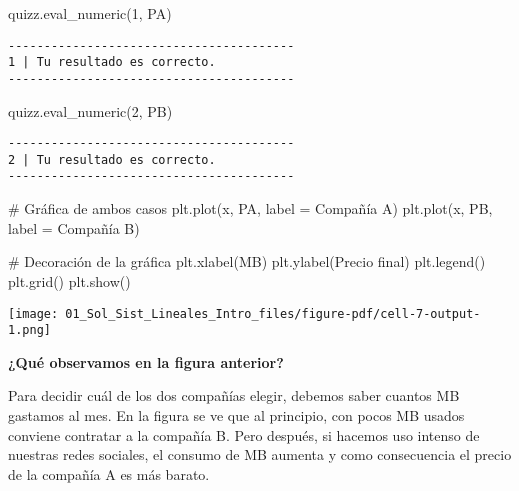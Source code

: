 \documentclass[
  letterpaper,
  DIV=11,
  numbers=noendperiod]{scrreprt}
\newenvironment{Shaded}{\begin{snugshade}}{\end{snugshade}}
\newcommand{\CommentTok}[1]{\textcolor[rgb]{0.37,0.37,0.37}{#1}}
\newcommand{\NormalTok}[1]{\textcolor[rgb]{0.00,0.23,0.31}{#1}}
\newcommand{\OperatorTok}[1]{\textcolor[rgb]{0.37,0.37,0.37}{#1}}
\newcommand{\StringTok}[1]{\textcolor[rgb]{0.13,0.47,0.30}{#1}}
\begin{document}
\begin{Shaded}
\begin{Highlighting}[]
\NormalTok{quizz.eval\_numeric(}\StringTok{\textquotesingle{}1\textquotesingle{}}\NormalTok{, PA)}
\end{Highlighting}
\end{Shaded}

\begin{verbatim}
----------------------------------------
1 | Tu resultado es correcto.
----------------------------------------
\end{verbatim}

\begin{Shaded}
\begin{Highlighting}[]
\NormalTok{quizz.eval\_numeric(}\StringTok{\textquotesingle{}2\textquotesingle{}}\NormalTok{, PB)}
\end{Highlighting}
\end{Shaded}

\begin{verbatim}
----------------------------------------
2 | Tu resultado es correcto.
----------------------------------------
\end{verbatim}

\begin{Shaded}
\begin{Highlighting}[]
\CommentTok{\# Gráfica de ambos casos}
\NormalTok{plt.plot(x, PA, label }\OperatorTok{=} \StringTok{\textquotesingle{}Compañía A\textquotesingle{}}\NormalTok{)}
\NormalTok{plt.plot(x, PB, label }\OperatorTok{=} \StringTok{\textquotesingle{}Compañía B\textquotesingle{}}\NormalTok{)}

\CommentTok{\# Decoración de la gráfica}
\NormalTok{plt.xlabel(}\StringTok{\textquotesingle{}MB\textquotesingle{}}\NormalTok{)}
\NormalTok{plt.ylabel(}\StringTok{\textquotesingle{}Precio final\textquotesingle{}}\NormalTok{)}
\NormalTok{plt.legend()}
\NormalTok{plt.grid()}
\NormalTok{plt.show()}
\end{Highlighting}
\end{Shaded}

\texttt{[image: 01\_Sol\_Sist\_Lineales\_Intro\_files/figure-pdf/cell-7-output-1.png]}

\textbf{¿Qué observamos en la figura anterior?}

Para decidir cuál de los dos compañías elegir, debemos saber cuantos MB
gastamos al mes. En la figura se ve que al principio, con pocos MB
usados conviene contratar a la compañía B. Pero después, si hacemos uso
intenso de nuestras redes sociales, el consumo de MB aumenta y como
consecuencia el precio de la compañía A es más barato.
\end{document}
